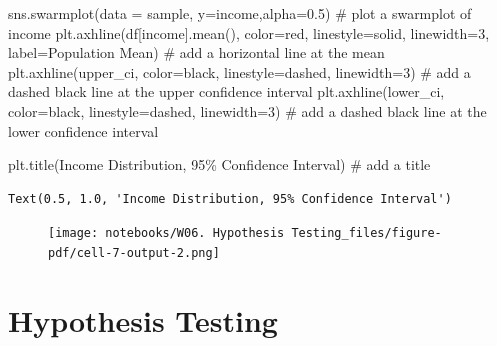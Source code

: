 \documentclass[
  letterpaper,
  DIV=11,
  numbers=noendperiod]{scrreprt}
\newenvironment{Shaded}{\begin{snugshade}}{\end{snugshade}}
\newcommand{\CommentTok}[1]{\textcolor[rgb]{0.37,0.37,0.37}{#1}}
\newcommand{\DecValTok}[1]{\textcolor[rgb]{0.68,0.00,0.00}{#1}}
\newcommand{\FloatTok}[1]{\textcolor[rgb]{0.68,0.00,0.00}{#1}}
\newcommand{\NormalTok}[1]{\textcolor[rgb]{0.00,0.23,0.31}{#1}}
\newcommand{\OperatorTok}[1]{\textcolor[rgb]{0.37,0.37,0.37}{#1}}
\newcommand{\StringTok}[1]{\textcolor[rgb]{0.13,0.47,0.30}{#1}}
\begin{document}
\begin{Shaded}
\begin{Highlighting}[]
\NormalTok{sns.swarmplot(data }\OperatorTok{=}\NormalTok{ sample, y}\OperatorTok{=}\StringTok{\textquotesingle{}income\textquotesingle{}}\NormalTok{,alpha}\OperatorTok{=}\FloatTok{0.5}\NormalTok{) }\CommentTok{\# plot a swarmplot of income}
\NormalTok{plt.axhline(df[}\StringTok{\textquotesingle{}income\textquotesingle{}}\NormalTok{].mean(), color}\OperatorTok{=}\StringTok{\textquotesingle{}red\textquotesingle{}}\NormalTok{, linestyle}\OperatorTok{=}\StringTok{\textquotesingle{}solid\textquotesingle{}}\NormalTok{, linewidth}\OperatorTok{=}\DecValTok{3}\NormalTok{, label}\OperatorTok{=}\StringTok{\textquotesingle{}Population Mean\textquotesingle{}}\NormalTok{) }\CommentTok{\# add a horizontal line at the mean}
\NormalTok{plt.axhline(upper\_ci, color}\OperatorTok{=}\StringTok{\textquotesingle{}black\textquotesingle{}}\NormalTok{, linestyle}\OperatorTok{=}\StringTok{\textquotesingle{}dashed\textquotesingle{}}\NormalTok{, linewidth}\OperatorTok{=}\DecValTok{3}\NormalTok{) }\CommentTok{\# add a dashed black line at the upper confidence interval}
\NormalTok{plt.axhline(lower\_ci, color}\OperatorTok{=}\StringTok{\textquotesingle{}black\textquotesingle{}}\NormalTok{, linestyle}\OperatorTok{=}\StringTok{\textquotesingle{}dashed\textquotesingle{}}\NormalTok{, linewidth}\OperatorTok{=}\DecValTok{3}\NormalTok{) }\CommentTok{\# add a dashed black line at the lower confidence interval}

\NormalTok{plt.title(}\StringTok{\textquotesingle{}Income Distribution, 95\% Confidence Interval\textquotesingle{}}\NormalTok{) }\CommentTok{\# add a title}
\end{Highlighting}
\end{Shaded}

\begin{verbatim}
Text(0.5, 1.0, 'Income Distribution, 95% Confidence Interval')
\end{verbatim}

\begin{figure}[H]

{\centering \texttt{[image: notebooks/W06. Hypothesis Testing\_files/figure-pdf/cell-7-output-2.png]}

}

\end{figure}

\hypertarget{hypothesis-testing-1}{%
\section{Hypothesis Testing}\label{hypothesis-testing-1}}
\end{document}
